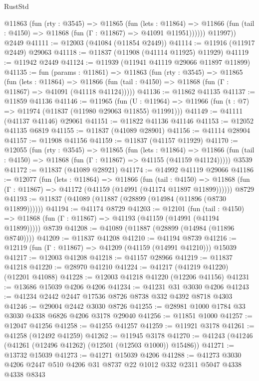 \begin{lexlean}{RustStd}
\begin{coremodule}
          @11863
            (fun (rty : @3545) =>
            @11865
              (fun (lets : @11864) =>
              @11866 (fun (tail : @4150) => @11868 (fun (Γ : @11867) => @41091 @11951))))))
        @11997))
    @2449
@41111 := @12003 (@41084 (@11854 @2449))
@41114 := @11916 (@11917 @2449) @29063
@41118 := @11837 (@11908 (@41114 @11925) @11929)
@41119 := @11942 @2449
@41124 := @11939 (@11941 @41119 @29066 @11897 @11899)
@41135 := fun (params : @11861) =>
  @11863
    (fun (rty : @3545) =>
    @11865
      (fun (lets : @11864) =>
      @11866 (fun (tail : @4150) => @11868 (fun (Γ : @11867) => @41091 (@41118 @41124)))))
@41136 := @11862 @41135
@41137 := @11859 @41136
@41146 := @11965
    (fun (U : @11964) => @11966 (fun (t : @7) => @11974 (@11837 (@11980 @29063 @11855) @11991)))
@41149 := @41111 (@41137 @41146) @29061
@41151 := @11822 @41136 @41146
@41153 := @12052 @41135 @6819
@41155 := @11837 (@41089 @28901)
@41156 := @41114 @28904
@41157 := @11908 @41156
@41159 := @11837 (@41157 @11929)
@41170 := @12055
    (fun (rty : @3545) =>
    @11865
      (fun (lets : @11864) =>
      @11866 (fun (tail : @4150) => @11868 (fun (Γ : @11867) => @41155 (@41159 @41124)))))
    @3539
@41172 := @11837 (@41089 @28921)
@41174 := @14992 @41119 @29066
@41186 := @12077
    (fun (lets : @11864) =>
    @11866
      (fun (tail : @4150) =>
      @11868 (fun (Γ : @11867) => @41172 (@41159 (@14991 (@41174 @11897 @11899))))))
    @8729
@41193 := @11837 (@41089 (@11887 (@28899 (@14984 (@11896 (@8730 @11899))))))
@41194 := @41174 @8729
@41203 := @12101
    (fun (tail : @4150) => @11868 (fun (Γ : @11867) => @41193 (@41159 (@14991 (@41194 @11899)))))
    @8739
@41208 := @41089 (@11887 (@28899 (@14984 (@11896 @8740))))
@41209 := @11837 @41208
@41210 := @41194 @8739
@41216 := @12119 (fun (Γ : @11867) => @41209 (@41159 (@14991 @41210))) @15039
@41217 := @12003 @41208
@41218 := @41157 @28966
@41219 := @11837 @41218
@41220 := @28970 @41210
@41224 := @41217 (@41219 @41220) (@12201 @41088)
@41228 := @12003 @41218 @41220 (@12206 @41156)
@41231 := @13686 @15039 @4206 @4206
@41234 := @41231 @31 @3030 @4206
@41243 := @41234 @2442 @2447 @17536 @8726 @8738 @332 @4392 @8718 @4303
@41246 := @29004 @2442 @3030 @8726
@41255 := @28981 @1000 @1784 @33 @3030 @4338 @6826 @4206 @3178 @29040
@41256 := @11851 @1000
@41257 := @12047 @41256
@41258 := @41255 @41257
@41259 := @11921 @3178
@41261 := @41258 (@12492 @41259)
@41262 := @11945 @3178
@41270 := @41243 (@41246 (@41261 (@12496 @41262) (@12501 (@12503 @1000)) @15486))
@41271 := @13732 @15039
@41273 := @41271 @15039 @4206
@41288 := @41273 @3030 @4206 @2447 @510 @4206 @31 @8737 @22 @1012 @332 @2311 @5047 @4338 @4338 @8343

\end{coremodule}
\end{lexlean}
